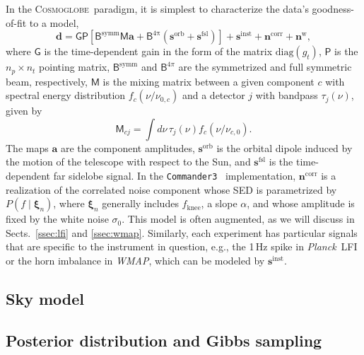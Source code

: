 \documentclass[twocolumn]{../../common/aa}
\def\WMAP{\emph{WMAP}}
\def\Planck{\emph{Planck}}
\def\commanderthree{\texttt{Commander3}}
\newcommand{\cosmoglobe}{\textsc{Cosmoglobe}}
\begin{document}
In the \cosmoglobe\ paradigm, it is simplest to characterize the data's goodness-of-fit to a model,
\begin{equation}
	\label{eq:model}
	\boldsymbol d =\mathsf G\mathsf P[\mathsf B^\mathrm{symm}\mathsf M\boldsymbol a+\mathsf B^\mathrm{4\pi}(\boldsymbol s^\mathrm{orb}
	+\boldsymbol s^\mathrm{fsl})] + \boldsymbol s^\mathrm{inst}+\boldsymbol n^\mathrm{corr}+\boldsymbol n^\mathrm w,
\end{equation}
where $\mathsf G$ is the time-dependent gain in the form of the matrix $\mathrm{diag}(g_t)$, $\mathsf P$ is the $n_p\times n_t$ pointing matrix, 
$\mathsf B^\mathrm{symm}$ and $\mathsf B^{4\pi}$ are the symmetrized and full symmetric beam, respectively, $\mathsf M$ is the mixing matrix between a given component $c$ with spectral energy distribution $f_c(\nu/\nu_{0,c})$ and a detector $j$ with bandpass $\tau_j(\nu)$, given by
\begin{equation}
	\mathsf M_{cj}=\int d\nu\,\tau_j(\nu)f_c(\nu/\nu_{c,0}).
\end{equation}
The maps $\boldsymbol a$ are the component amplitudes, $\boldsymbol s^\mathrm{orb}$ is the orbital dipole induced by the motion of the telescope with respect to the Sun, and $\boldsymbol s^\mathrm{fsl}$ is the time-dependent far sidelobe signal. In the \commanderthree\ \citep{bp03} implementation, $\boldsymbol n^\mathrm{corr}$ is a realization of the correlated noise component whose SED is parametrized by $P(f\mid\boldsymbol\xi_n)$, where $\boldsymbol\xi_n$ generally includes $f_\mathrm{knee}$, a slope $\alpha$, and whose amplitude is fixed by the white noise $\sigma_0$. This model is often augmented, as we will discuss in Sects.~\ref{ssec:lfi} and \ref{ssec:wmap}. Similarly, each experiment has particular signals that are specific to the instrument in question, e.g., the 1\,Hz spike in \Planck\ LFI or the horn imbalance in \WMAP, which can be modeled by $\boldsymbol s^\mathrm{inst}$.

\subsection{Sky model}


\subsection{Posterior distribution and Gibbs sampling}
\end{document}
